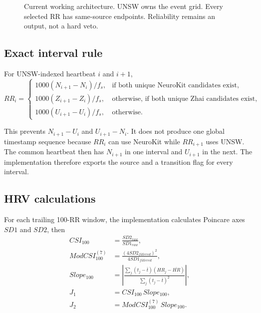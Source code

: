 \documentclass[10pt]{article}
\begin{document}
\begin{figure}[H]
\caption{Current working architecture. UNSW owns the event grid. Every selected RR has
same-source endpoints. Reliability remains an output, not a hard veto.}
\end{figure}

\subsection{Exact interval rule}

For UNSW-indexed heartbeat $i$ and $i+1$,
\begin{equation}
RR_i=
\begin{cases}
1000(N_{i+1}-N_i)/f_s,
&\text{if both unique NeuroKit candidates exist},\\[3pt]
1000(Z_{i+1}-Z_i)/f_s,
&\text{otherwise, if both unique Zhai candidates exist},\\[3pt]
1000(U_{i+1}-U_i)/f_s,
&\text{otherwise}.
\end{cases}
\end{equation}

This prevents $N_{i+1}-U_i$ and $U_{i+1}-N_i$. It does not produce one global
timestamp sequence because $RR_i$ can use NeuroKit while $RR_{i+1}$ uses UNSW.
The common heartbeat then has $N_{i+1}$ in one interval and $U_{i+1}$ in the
next. The implementation therefore exports the source and a transition flag
for every interval.

\subsection{HRV calculations}

For each trailing 100-RR window, the implementation calculates Poincare axes
$SD1$ and $SD2$, then
\begin{align}
CSI_{100} &= \frac{SD2_{raw}}{SD1_{raw}},\\
ModCSI^{(7)}_{100} &= \frac{(4SD2_{filtered})^2}{4SD1_{filtered}},\\
Slope_{100} &= \left|\frac{\sum_j(t_j-\bar{t})(HR_j-\overline{HR})}
                         {\sum_j(t_j-\bar{t})^2}\right|,\\
J_1 &= CSI_{100}\,Slope_{100},\\
J_2 &= ModCSI^{(7)}_{100}\,Slope_{100}.
\end{align}
\end{document}
